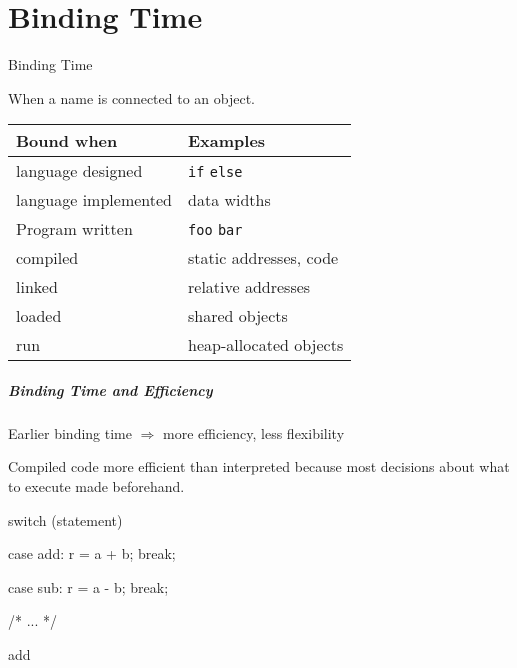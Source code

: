 \documentclass{plt}
\begin{document}
\part{Binding Time}

\begin{frame}{Binding Time}

When a name is connected to an object.

\begin{tabular}{@{}ll@{}}
\toprule
\textbf{Bound when} & \textbf{Examples} \\
\midrule
language designed & \texttt{if} \texttt{else} \\
language implemented & data widths \\
Program written & \texttt{foo} \texttt{bar} \\
compiled & static addresses, code \\
linked & relative addresses \\
loaded & shared objects \\
run & heap-allocated objects \\
\bottomrule
\end{tabular}

\end{frame}



\begin{frame}[fragile]
  \frametitle{Binding Time and Efficiency}

Earlier binding time $\Rightarrow$ more efficiency, less flexibility

Compiled code more efficient than interpreted because most decisions
about what to execute made beforehand.

\begin{minipage}{0.5\textwidth}
\begin{C}
switch (statement) {

case add:
   r = a + b;
   break;

case sub:
   r = a - b;
   break;

   /* ... */
}
\end{C}
\end{minipage}%
\begin{minipage}{0.5\textwidth}
\begin{shadedverbatim}
add %
\end{shadedverbatim}
\end{minipage}

\end{frame}
\end{document}
